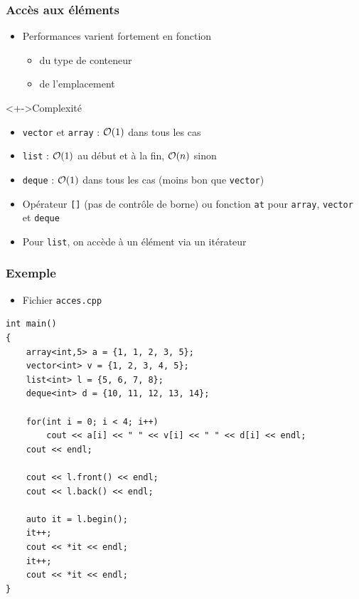 \begin{frame}
\frametitle{Accès aux éléments}
\begin{itemize}
\item Performances varient fortement en fonction
	\begin{itemize}
	\item du type de conteneur
	\item de l'emplacement
	\end{itemize}
\end{itemize}
\begin{exampleblock}<+->{Complexité}
	\begin{itemize}[<+->]
	\item \texttt{vector} et \texttt{array} : ${\mathcal{O}}(1)$ dans tous les cas
	\item \texttt{list} : ${\mathcal{O}}(1)$ au début et à la fin, ${\mathcal{O}}(n)$ sinon
	\item \texttt{deque} : ${\mathcal{O}}(1)$ dans tous les cas (moins bon que \texttt{vector})
	\end{itemize}
\end{exampleblock}
\begin{itemize}
\item Opérateur \texttt{[]} (pas de contrôle de borne) ou fonction \texttt{at} pour \texttt{array}, \texttt{vector} et \texttt{deque}
\item Pour \texttt{list}, on accède à un élément via un itérateur
\end{itemize}
\end{frame}

\begin{frame}[containsverbatim]
\frametitle{Exemple}
\begin{itemize}
\item Fichier \texttt{acces.cpp}
\end{itemize}
\begin{lstlisting}
int main()
{
    array<int,5> a = {1, 1, 2, 3, 5};
	vector<int> v = {1, 2, 3, 4, 5};
	list<int> l = {5, 6, 7, 8};
	deque<int> d = {10, 11, 12, 13, 14};

	for(int i = 0; i < 4; i++)
		cout << a[i] << " " << v[i] << " " << d[i] << endl;
	cout << endl;

	cout << l.front() << endl;	
	cout << l.back() << endl;

	auto it = l.begin();
	it++;
	cout << *it << endl;
	it++;
	cout << *it << endl;
}
\end{lstlisting}
\end{frame}

